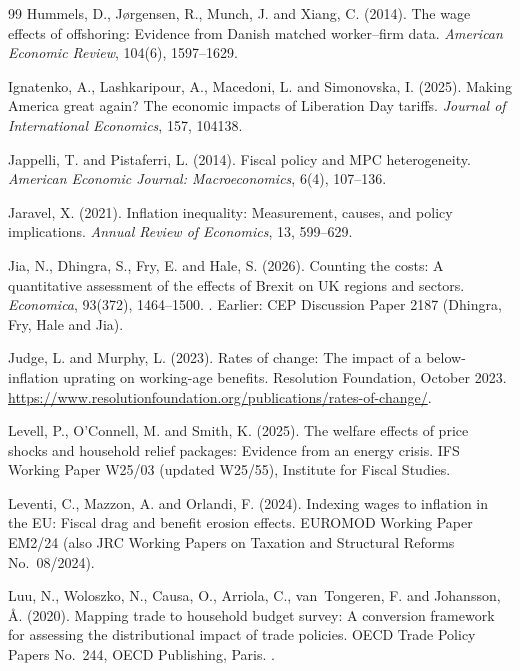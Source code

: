 \begin{thebibliography}{99}
Hummels, D., J\o{}rgensen, R., Munch, J. and Xiang, C. (2014).
\newblock The wage effects of offshoring: Evidence from Danish matched worker--firm data.
\newblock \emph{American Economic Review}, 104(6), 1597--1629.

Ignatenko, A., Lashkaripour, A., Macedoni, L. and Simonovska, I. (2025).
\newblock Making America great again? The economic impacts of Liberation Day tariffs.
\newblock \emph{Journal of International Economics}, 157, 104138.

Jappelli, T. and Pistaferri, L. (2014).
\newblock Fiscal policy and MPC heterogeneity.
\newblock \emph{American Economic Journal: Macroeconomics}, 6(4), 107--136.

Jaravel, X. (2021).
\newblock Inflation inequality: Measurement, causes, and policy implications.
\newblock \emph{Annual Review of Economics}, 13, 599--629.

Jia, N., Dhingra, S., Fry, E. and Hale, S. (2026).
\newblock Counting the costs: A quantitative assessment of the effects of Brexit on UK regions and sectors.
\newblock \emph{Economica}, 93(372), 1464--1500. . Earlier: CEP Discussion Paper 2187 (Dhingra, Fry, Hale and Jia).

Judge, L. and Murphy, L. (2023).
\newblock Rates of change: The impact of a below-inflation uprating on working-age benefits.
\newblock Resolution Foundation, October 2023. \url{https://www.resolutionfoundation.org/publications/rates-of-change/}.

Levell, P., O'Connell, M. and Smith, K. (2025).
\newblock The welfare effects of price shocks and household relief packages: Evidence from an energy crisis.
\newblock IFS Working Paper W25/03 (updated W25/55), Institute for Fiscal Studies.

Leventi, C., Mazzon, A. and Orlandi, F. (2024).
\newblock Indexing wages to inflation in the EU: Fiscal drag and benefit erosion effects.
\newblock EUROMOD Working Paper EM2/24 (also JRC Working Papers on Taxation and Structural Reforms No.~08/2024).

Luu, N., Woloszko, N., Causa, O., Arriola, C., van~Tongeren, F. and Johansson, \AA. (2020).
\newblock Mapping trade to household budget survey: A conversion framework for assessing the distributional impact of trade policies.
\newblock OECD Trade Policy Papers No.~244, OECD Publishing, Paris. .


\end{thebibliography}
